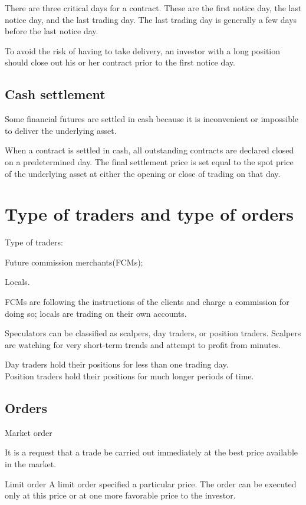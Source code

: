 \documentclass{article}
\begin{document}
There are three critical days for a contract. These are the first notice day, the last notice day, and the last trading day. The last trading day is generally a few days before the last notice day.

To avoid the risk of having to take delivery, an investor with a long position should close out his or her contract prior to the first notice day.

\subsection{Cash settlement}
Some financial futures are settled in cash because it is inconvenient or impossible to deliver the underlying asset.

When a contract is settled in cash, all outstanding contracts are declared closed on a predetermined day. The final settlement price is set equal to the spot price of the underlying asset at either the opening or close of trading on that day.

\section{Type of traders and type of orders}
Type of traders:

Future commission merchants(FCMs);

Locals.

FCMs are following the instructions of the clients and charge a commission for doing so; locals are trading on their own accounts.

Speculators can be classified as scalpers, day traders, or position traders.
Scalpers are watching for very short-term trends and attempt to profit from minutes.

Day traders hold their positions for less than  one trading day. 
\\
Position traders hold their positions for much longer periods of time.

\subsection{Orders}
Market order

It is a request that a trade be carried out immediately at the best price available in the market.
\\ \hspace*{\fill}

Limit order
A limit order specified a particular price. The order can be executed only at this price or at one more favorable price to the investor.
\\ \hspace*{\fill}
\end{document}
